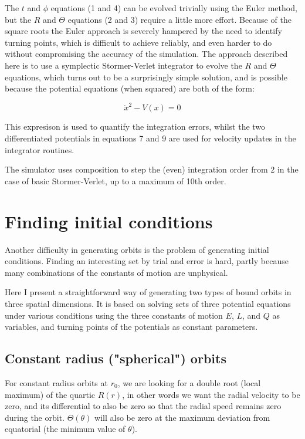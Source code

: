 \documentclass[11pt]{article}
\begin{document}
The $t$ and $\phi$ equations (1 and 4) can be evolved trivially using the Euler method, but the $R$ and $\Theta$ equations (2 and 3) require a little more effort.  Because of the square roots the Euler approach is severely hampered by the need to identify turning points, which is difficult to achieve reliably, and even harder to do without compromising the accuracy of the simulation.  The approach described here is to use a symplectic Stormer-Verlet integrator \cite{hairer} to evolve the $R$ and $\Theta$ equations, which turns out to be a surprisingly simple solution, and is possible because the potential equations (when squared) are both of the form:

\begin{equation}
\dot x^2 - V(x) = 0
\end{equation}

This expresison is used to quantify the integration errors, whilst the two differentiated potentials in equations 7 and 9 are used for velocity updates in the integrator routines.

The simulator uses composition \cite{hairer} to step the (even) integration order from 2 in the case of basic Stormer-Verlet, up to a maximum of 10th order.

\section{Finding initial conditions}

Another difficulty in generating orbits is the problem of generating initial conditions.  Finding an interesting set by trial and error is hard, partly because many combinations of the constants of motion are unphysical.

Here I present a straightforward way of generating two types of bound orbits in three spatial dimensions.  It is based on solving sets of three potential equations under various conditions using the three constants of motion $E$, $L$, and $Q$ as variables, and turning points of the potentials as constant parameters.

\subsection{Constant radius ("spherical") orbits}

For constant radius orbits at $r_0$, we are looking for a double root (local maximum) of the quartic $R(r)$, in other words we want the radial velocity to be zero, and its differential to also be zero so that the radial speed remains zero during the orbit.  $\Theta (\theta)$ will also be zero at the maximum deviation from equatorial (the minimum value of $\theta$).
\end{document}
